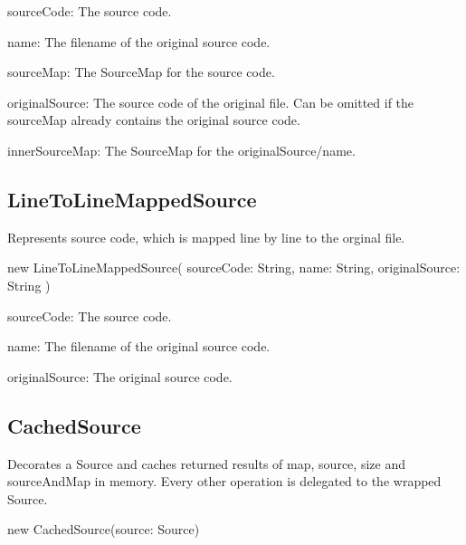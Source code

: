 \begin{DoxyItemize}
\item {\ttfamily source\+Code}\+: The source code.
\item {\ttfamily name}\+: The filename of the original source code.
\item {\ttfamily source\+Map}\+: The Source\+Map for the source code.
\item {\ttfamily original\+Source}\+: The source code of the original file. Can be omitted if the {\ttfamily source\+Map} already contains the original source code.
\item {\ttfamily inner\+Source\+Map}\+: The Source\+Map for the {\ttfamily original\+Source}/{\ttfamily name}.
\end{DoxyItemize}

\subsection*{{\ttfamily Line\+To\+Line\+Mapped\+Source}}

Represents source code, which is mapped line by line to the orginal file.


\begin{DoxyCode}
new LineToLineMappedSource(
    sourceCode: String,
    name: String,
    originalSource: String
)
\end{DoxyCode}



\begin{DoxyItemize}
\item {\ttfamily source\+Code}\+: The source code.
\item {\ttfamily name}\+: The filename of the original source code.
\item {\ttfamily original\+Source}\+: The original source code.
\end{DoxyItemize}

\subsection*{{\ttfamily Cached\+Source}}

Decorates a {\ttfamily Source} and caches returned results of {\ttfamily map}, {\ttfamily source}, {\ttfamily size} and {\ttfamily source\+And\+Map} in memory. Every other operation is delegated to the wrapped {\ttfamily Source}.


\begin{DoxyCode}
new CachedSource(source: Source)
\end{DoxyCode}


